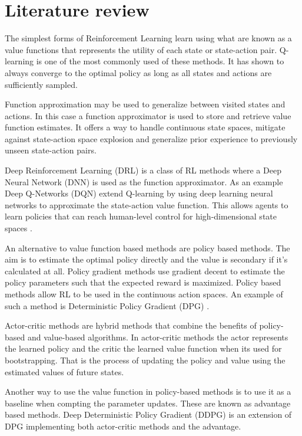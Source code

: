 \section{Literature review}
The simplest forms of Reinforcement Learning learn using what are known as a value functions that represents the utility of each state or state-action pair. Q-learning is one of the most commonly used of these methods. It has shown to always converge to the optimal policy as long as all states and actions are sufficiently sampled. \cite{watkins1992q}

Function approximation may be used to generalize between visited states and actions. In this case a function approximator is used to store and retrieve value function estimates. It offers a way to handle continuous state spaces, mitigate against state-action space explosion and generalize prior experience to previously unseen state-action pairs.

Deep Reinforcement Learning (DRL) is a class of RL methods where a Deep Neural Network (DNN) is used as the function approximator. As an example Deep Q-Networks (DQN) extend Q-learning by using deep learning neural networks to approximate the state-action value function. This allows agents to learn policies that can reach human-level control for high-dimensional state spaces \cite{mnih2015human}. 

An alternative to value function based methods are policy based methods. The aim is to estimate the optimal policy directly and the value is secondary if it's calculated at all. Policy gradient methods use gradient decent to estimate the policy parameters such that the expected reward is maximized. Policy based methods allow RL to be used in the continuous action spaces. An example of such a method is Deterministic Policy Gradient (DPG) \cite{silver2014deterministic}. 

Actor-critic methods are hybrid methods that combine the benefits of policy-based and value-based algorithms. In actor-critic methods the actor represents the learned policy and the critic the learned value function when its used for bootstrapping. That is the process of updating the policy and value using the estimated values of future states\cite{sutton2018reinforcement}.

Another way to use the value function in policy-based methods is to use it as a baseline when compting the parameter updates. These are known as advantage based methods. Deep Deterministic Policy Gradient (DDPG) is an extension of DPG \cite{lillicrap2015continuous} implementing both actor-critic methods and the advantage.

